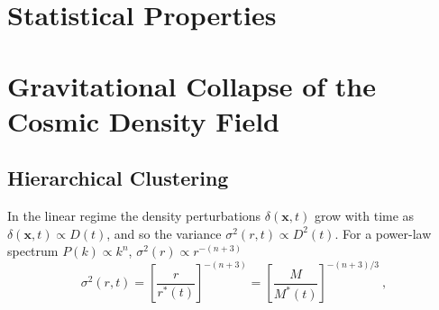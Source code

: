 \documentclass[12pt,a4paper]{article}
\renewcommand{\vec}[1]{\boldsymbol{#1}}
\begin{document}
\section{Statistical Properties}
\cite{2010gfe..book.....M} 

















































\section{Gravitational Collapse of the Cosmic Density Field}

\subsection{Hierarchical Clustering}
\cite{2010gfe..book.....M} In the linear regime the density perturbations $\delta(\vec{x},t)$ grow with time as $\delta(\vec{x},t) \propto D(t)$, and so the variance $\sigma^2(r,t) \propto D^2(t)$. For a power-law spectrum $P(k) \propto k^n$, $\sigma^2(r) \propto r^{-(n+3)}$
\begin{equation}
\sigma^2(r,t) = \left[\dfrac{r}{r^\ast(t)} \right]^{-(n+3)} = \left[ \dfrac{M}{M^\ast(t)}  \right]^{-(n+3)/3} ~,
\end{equation}
\end{document}
